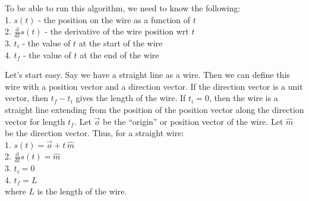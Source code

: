 \documentclass[12pt]{article}
\newcommand{\spaces}{\phantom{\qquad}}
\newcommand{\diff}{\frac{\mathrm{d}}{\mathrm{d}t}}
\begin{document}
	To be able to run this algorithm, we need to know the following: \\
		\spaces 1. $s(t)$ - the position on the wire as a function of $t$ \\
		\spaces 2. $\diff s(t) $ - the derivative of the wire position wrt $t$ \\
		\spaces 3. $t_i$ - the value of $t$ at the start of the wire \\
		\spaces 4. $t_f$ - the value of $t$ at the end of the wire
		
	Let's start easy. Say we have a straight line as a wire. Then we can define this wire with a position vector and a direction vector. If the direction vector is a unit vector, then $t_f - t_i$ gives the length of the wire. If $t_i = 0$, then the wire is a straight line extending from the position of the position vector along the direction vector for length $t_f$. Let $\vec{o}$ be the ``origin'' or position vector of the wire. Let $\hat{m}$ be the direction vector. Thus, for a straight wire: \\
		\spaces 1. $s(t) = \vec{o} + t\,\hat{m}$  \\
		\spaces 2. $\diff s(t) = \hat{m}$ \\
		\spaces 3. $t_i = 0$ \\
		\spaces 4. $t_f = L$ \\
	where $L$ is the length of the wire.
	
\end{document}
